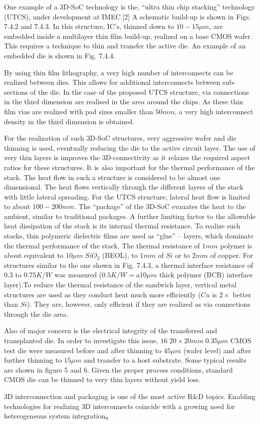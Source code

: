 One example of a 3D-SoC technology is the, ``ultra thin chip stacking''
technology (UTCS), under development at IMEC.[2] A
schematic build-up is shown in Figs. 7.4.2 and 7.4.3. In this structure,
IC's, thinned down to $10-15 \mu m$, are embedded inside a multilayer
thin film build-up, realized on a base CMOS wafer. This
requires a technique to thin and transfer the active die. An example
of an embedded die is shown in Fig. 7.4.4.

By using thin film lithography, a very high number of interconnects
can be realized between dies. This allows for additional
interconnects between sub-sections of the die. In the case of the
proposed UTCS structure, via connections in the third dimension
are realised in the area around the chips. As these thin film vias
are realized with pad sizes smaller than $50mm$, a very high
interconnect density in the third dimension is obtained.

For the realization of such 3D-SoC structures, very aggressive
wafer and die thinning is used, eventually reducing the die to the
active circuit layer. The use of very thin layers is improves the 3D-connectivity
as it relaxes the required aspect ratios for these structures.
It is also important for the thermal performance of the stack.
The heat flow in such a structure is considered to be almost one dimensional.
The heat flows vertically through the different layers
of the stack with little lateral spreading. For the UTCS structure,
lateral heat flow is limited to about $100-200mm$. The ``package'' of
the 3D-SoC evauates the heat to the ambient, similar to traditional
packages. A further limiting factor to the allowable heat dissipation
of the stack is its internal thermal resistance. To realize such
stacks, thin polymeric dielectric films are used as ``glue'' – layers,
which dominate the thermal performance of the stack. The thermal
resistance of $1mm$ polymer is about equivalent to $10\mu m \; SiO_2$
(BEOL), to $1mm$ of $Si$ or to $2mm$ of copper. For structures similar
to the one shown in Fig. 7.4.3, a thermal interface resistance of $0.3$
to $0.75 K/W$ was measured ($0.5 K/W = \textrm{a} 10\mu m$ thick polymer (BCB)
interface layer).To reduce the thermal resistance of the sandwich
layer, vertical metal structures are used as they conduct heat much
more efficiently ($Cu$ is $2\times$ better than $Si$). They are, however, only
efficient if they are realized as via connections through the die area.

Also of major concern is the electrical integrity of the transferred
and transplanted die. In order to investigate this issue, $16 \; 20\times20
mm\;0.35 \mu m$ CMOS test die were measured before and after thinning
to $45 \mu m$ (wafer level) and after further thinning to $15 \mu m$ and
transfer to a host substrate. Some typical results are shown in figure
5 and 6. Given the proper process conditions, standard CMOS
die can be thinned to very thin layers without yield loss.

3D interconnection and packaging is one of the most active R\&D
topics. Enabling technologies for realizing 3D interconnects
coincide with a growing need for heterogeneous system integration。